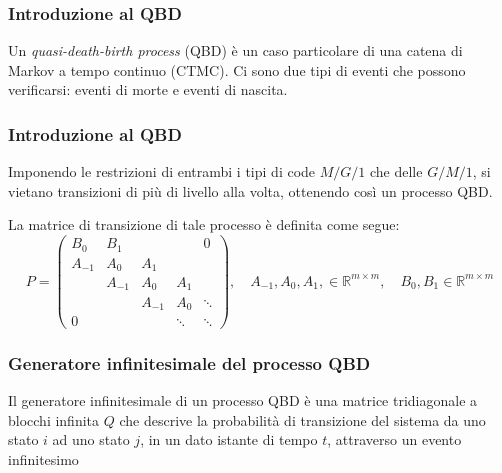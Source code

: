 \documentclass{beamer}
\begin{document}
\begin{frame}
    \frametitle{Introduzione al QBD}
    \begin{block}{}
        Un \emph{quasi-death-birth process} (QBD) è un caso particolare di una catena di Markov a tempo continuo (CTMC). Ci sono due tipi di eventi che possono verificarsi: eventi di morte e eventi di nascita.
    \end{block}

\end{frame}


\begin{frame}
    \frametitle{Introduzione al QBD}
    \begin{block}{}
        Imponendo le restrizioni di entrambi i tipi di code $M/G/1$ che delle $G/M/1$, si vietano transizioni di più di livello alla volta, ottenendo così un processo QBD.
    \end{block}
    La matrice di transizione di tale processo è definita come segue:
    \begin{equation*}
        P=
        \begin{pmatrix}
            B_0 & B_1 & & & 0 \\
            A_{-1} & A_0 & A_1 & & \\
            & A_{-1} & A_0 & A_1 & \\
            & & A_{-1} & A_0 & \ddots \\
            0 & & & \ddots & \ddots
        \end{pmatrix}
        ,\quad A_{-1}, A_0, A_1, \in \mathbb{R}^{m \times m}, \quad B_0, B_1 \in \mathbb{R}^{m \times m}
    \end{equation*}
\end{frame}


\begin{frame}
    \frametitle{Generatore infinitesimale del processo QBD}
    \begin{block}{}
        Il generatore infinitesimale di un processo QBD è una matrice tridiagonale a blocchi infinita $Q$ che descrive la probabilità di transizione del sistema da uno stato $i$ ad uno stato $j$, in un dato istante di tempo $t$, attraverso un evento infinitesimo
    \end{block}
\end{frame}
\end{document}
